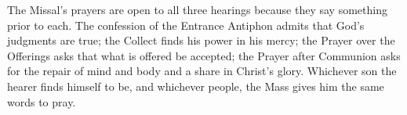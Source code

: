 The Missal's prayers are open to all three hearings because they say something
prior to each. The confession of the Entrance Antiphon admits that God's
judgments are true; the Collect finds his power in his mercy; the Prayer over
the Offerings asks that what is offered be accepted; the Prayer after
Communion asks for the repair of mind and body and a share in Christ's glory.
Whichever son the hearer finds himself to be, and whichever people, the Mass
gives him the same words to pray.
